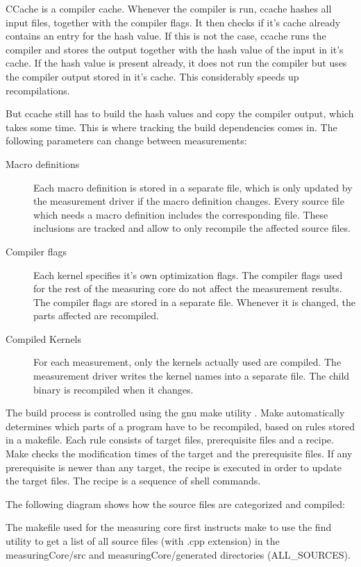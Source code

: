 \documentclass[a4paper,12pt]{article}
\newlength{\imgwidth}
\newcommand{\umlDiagram}[1]{%
	\settowidth{\imgwidth}{\texttt{[image: out/diagrams/\#1.pdf]}}%
	\setlength{\imgwidth}{\minof{0.5\imgwidth}{\textwidth}}%
	\par\vskip0.5cm\noindent\makebox[\textwidth][c]{%
	\texttt{[image: out/diagrams/\#1.pdf]}%
}\vskip0.5cm}
\begin{document}
CCache is a compiler cache. Whenever the compiler is run, ccache hashes all
input files, together with the compiler flags. It then checks if it's cache
already contains an entry for the hash value. If this is not the case, ccache
runs the compiler and stores the output together with the hash value of the
input in it's cache. If the hash value is present already, it does not run the
compiler but uses the compiler output stored in it's cache. This considerably
speeds up recompilations.

But ccache still has to build the hash values and copy the compiler output,
which takes some time. This is where tracking the build dependencies comes in.
The following parameters can change between measurements:
\begin{description}
\item[Macro definitions]
Each macro definition is stored in a separate file, which is only updated by the
measurement driver if the macro definition changes. Every source file which
needs a macro definition includes the corresponding file. These inclusions are
tracked and allow to only recompile the affected source files.
\item[Compiler flags] 
Each kernel specifies it's own optimization flags. The compiler flags used for
the rest of the measuring core do not affect the measurement results. The compiler
flags are stored in a separate file. Whenever it is changed, the parts affected
are recompiled.
\item[Compiled Kernels]
For each measurement, only the kernels actually used are compiled. The
measurement driver writes the kernel names into a separate file. The child
binary is recompiled when it changes.
\end{description}

The build process is controlled using the gnu make utility \cite{make}. Make
automatically determines which parts of a program have to be recompiled, based
on rules stored in a makefile. Each rule consists of target files, prerequisite
files and a recipe. Make checks the modification times of the target and the
prerequisite files. If any prerequisite is newer than any target, the recipe is
executed in order to update the target files. The recipe is a sequence of shell
commands.

The following diagram shows how the source files are categorized and compiled:

\umlDiagram{MeasuringCoreBuild}

The makefile used for the measuring core first instructs make to use the find
utility to get a list of all source files (with .cpp extension) in the
measuringCore/src and measuringCore/generated directories (ALL\_SOURCES).
\end{document}

